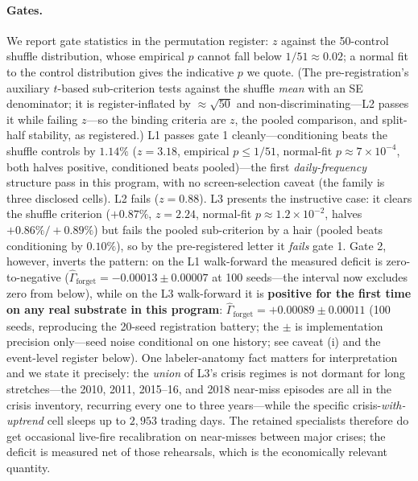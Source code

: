 \documentclass{article}
\begin{document}
\paragraph{Gates.} We report gate statistics in the permutation
register: $z$ against the 50-control shuffle distribution, whose
empirical $p$ cannot fall below $1/51 \approx 0.02$; a normal fit to the
control distribution gives the indicative $p$ we quote. (The
pre-registration's auxiliary $t$-based sub-criterion tests against the
shuffle \emph{mean} with an SE denominator; it is register-inflated by
$\approx\sqrt{50}$ and non-discriminating---L2 passes it while failing
$z$---so the binding criteria are $z$, the pooled comparison, and
split-half stability, as registered.) L1 passes gate 1
cleanly---conditioning beats the shuffle controls by $1.14\%$
($z{=}3.18$, empirical $p \le 1/51$, normal-fit
$p \approx 7\times10^{-4}$, both halves positive, conditioned beats
pooled)---the first \emph{daily-frequency} structure pass in this
program, with no screen-selection caveat (the family is three disclosed
cells). L2 fails ($z{=}0.88$). L3 presents the instructive case: it
clears the shuffle criterion ($+0.87\%$, $z{=}2.24$, normal-fit
$p \approx 1.2\times10^{-2}$, halves $+0.86\%/+0.89\%$) but fails the
pooled sub-criterion by a hair (pooled beats conditioning by $0.10\%$),
so by the pre-registered letter it \emph{fails} gate 1. Gate 2, however,
inverts the pattern: on the L1 walk-forward the measured deficit is
zero-to-negative ($\hat\Gamma_{\mathrm{forget}} = -0.00013 \pm 0.00007$
at 100 seeds---the interval now excludes zero from below),
while on the L3 walk-forward it is \textbf{positive for the first time
on any real substrate in this program}:
$\hat\Gamma_{\mathrm{forget}} = +0.00089 \pm 0.00011$ (100 seeds,
reproducing the 20-seed registration battery; the $\pm$ is
implementation precision only---seed noise conditional on one
history; see caveat (i) and the event-level register below). One
labeler-anatomy fact matters for interpretation and we state it
precisely: the \emph{union} of L3's crisis regimes is not dormant for
long stretches---the 2010, 2011, 2015--16, and 2018 near-miss episodes
are all in the crisis inventory, recurring every one to three
years---while the specific crisis-\emph{with-uptrend} cell sleeps up to
$2{,}953$ trading days. The retained specialists therefore do get
occasional live-fire recalibration on near-misses between major crises;
the deficit is measured net of those rehearsals, which is the
economically relevant quantity.
\end{document}
